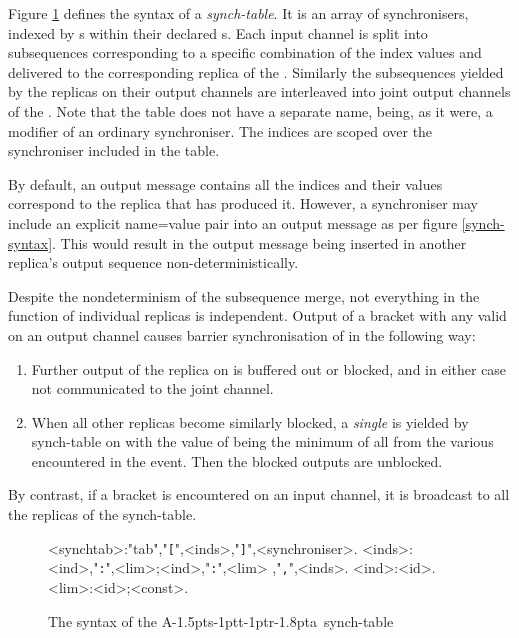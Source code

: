 \documentclass[11pt]{report}
\def\ak{{\textsf{A\kern-1.5pts\kern-1ptt\kern-1ptr\kern-1.8pta}}\kern-2pt{\it K\kern-2ptahn}}
\begin{document}
Figure \ref{synchtab-syntax} defines the syntax of a {\em synch-table}. It is an array of synchronisers, indexed by s within their declared s. Each input channel is split into subsequences corresponding to a specific  combination of the index values and delivered to the corresponding replica of the . Similarly the subsequences yielded by the replicas on their output channels are interleaved into joint output channels of the . Note that the table does not have a separate name, being, as it were, a modifier of an ordinary synchroniser. The indices are scoped over the synchroniser included in the table.

By default, an output message contains all the indices and their values correspond to the replica that has produced it. However, a synchroniser may include an explicit name=value pair into an output message as per figure \ref{synch-syntax}. This would result in the output message being inserted in another replica's output sequence non-deterministically.

Despite the nondeterminism of the subsequence merge, not everything in the function of individual replicas is independent.
Output of a bracket  with any valid  on an output channel  causes barrier synchronisation of  in the following way:
\begin{enumerate}
\item Further output of the replica on  is buffered out or blocked, and in either case not communicated to the joint channel.
\item When all other replicas become similarly blocked, a {\em single}  is yielded by synch-table on  with the value of  being the minimum of all  from the various  encountered in the event. Then the blocked outputs are unblocked.
\end{enumerate}
By contrast, if a bracket  is encountered on an input channel, it is broadcast to all the replicas of the synch-table.

\begin{figure}
\begin{framed}
\begin{grammar}
[(colon){}]
[(semicolon)]
[(comma){}]
[(period){\\}]
[(quote){\begin{bf}}{\end{bf}}]
[(nonterminal){}{}]
<synchtab>:"tab","{\tt [}",<inds>,"{\tt ]}",<synchroniser>.
<inds>:<ind>,"{\tt :}",<lim>;<ind>,"{\tt :}",<lim> ,"{\tt,}",<inds>.
<ind>:<id>.
<lim>:<id>;<const>.
\end{grammar}
\end{framed}
\caption{The syntax of the \ak\ synch-table\label{synchtab-syntax}}
\end{figure}
\end{document}
